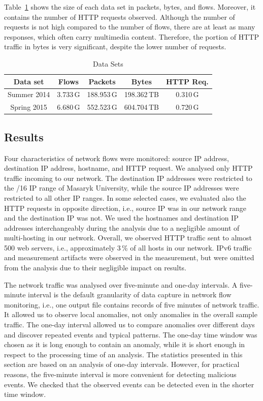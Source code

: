 Table~\ref{tab:httpsecurity-data-sets} shows the size of each data set in packets, bytes, and flows. Moreover, it contains the number of HTTP requests observed. Although the number of requests is not high compared to the number of flows, there are at least as many responses, which often carry multimedia content. Therefore, the portion of HTTP traffic in bytes is very significant, despite the lower number of requests.

\begin{table}[ht]
\centering
\begin{tabular}{| c | c | c | c | c |} \hline
Data set &  Flows & Packets & Bytes & HTTP Req.\\ \hline
Summer 2014 & 3.733\,G & 188.953\,G & 198.362\,TB & 0.310\,G \\ \hline
Spring 2015 & 6.680\,G & 552.523\,G & 604.704\,TB & 0.720\,G \\ \hline
\end{tabular}
\caption{Data Sets}
\label{tab:httpsecurity-data-sets}
\end{table}


\subsection{Results}\label{subsec:httpsecurity-results}

Four characteristics of network flows were monitored: source IP address, destination IP address, hostname, and HTTP request. We analysed only HTTP traffic incoming to our network. The destination IP addresses were restricted to the /16 IP range of Masaryk University, while the source IP addresses were restricted to all other IP ranges. In some selected cases, we evaluated also the HTTP requests in opposite direction, i.e., source IP was in our network range and the destination IP was not. We used the hostnames and destination IP addresses interchangeably during the analysis due to a negligible amount of multi-hosting in our network. Overall, we observed HTTP traffic sent to almost 500 web servers, i.e., approximately 3\,\% of all hosts in our network. IPv6 traffic and measurement artifacts were observed in the measurement, but were omitted from the analysis due to their negligible impact on results.

The network traffic was analysed over five-minute and one-day intervals. A five-minute interval is the default granularity of data capture in network flow monitoring, i.e., one output file contains records of five minutes of network traffic. It allowed us to observe local anomalies, not only anomalies in the overall sample traffic. The one-day interval allowed us to compare anomalies over different days and discover repeated events and typical patterns. The one-day time window was chosen as it is long enough to contain an anomaly, while it is short enough in respect to the processing time of an analysis. The statistics presented in this section are based on an analysis of one-day intervals. However, for practical reasons, the five-minute interval is more convenient for detecting malicious events. We checked that the observed events can be detected even in the shorter time window.

